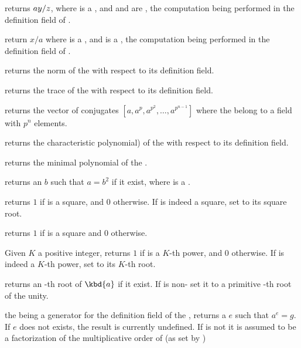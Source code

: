  returns $a\*y/z$, where 
is a , and  and  are , the computation being
performed in the definition field of .

 return $x/a$ where  is a
, and  is a , the computation being
performed in the definition field of .

 returns the norm of the   with
respect to its definition field.

 returns the trace of the   with
respect to its definition field.

 returns the vector of conjugates
$[a,a^p,a^{p^2},\ldots,a^{p^{n-1}}]$ where the   belong to a
field with $p^n$ elements.

 returns the characteristic polynomial) of the
  with respect to its definition field.

 returns the minimal polynomial of
the  .

 returns an  $b$ such that $a=b^2$ if
it exist, where  is a .

 returns $1$ if  is a
square, and $0$ otherwise. If  is indeed a square, set  to its
square root.

 returns $1$ if  is a square and $0$
otherwise.

 Given $K$ a positive integer,
returns $1$ if  is a $K$-th power, and $0$ otherwise. If  is
indeed a $K$-th power, set  to its $K$-th root.

 returns an -th root of
$\kbd{a}$ if it exist. If  is non- set it to a primitive
-th root of the unity.

 the   being a
generator for the definition field of the  , returns a
 $e$ such that $a^e=g$.  If $e$ does not exists, the result is
currently undefined. If  is not  it is assumed to be a
factorization of the multiplicative order of  (as set by
)

